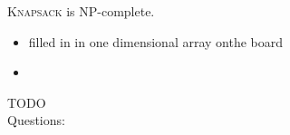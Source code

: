 \documentclass[a4]{scrartcl}
\begin{document}
\textsc{Knapsack} is NP-complete.

\begin{itemize}
\item filled in in one dimensional array onthe board
\item 
\end{itemize}













\color{red} TODO \\
\color{black}
\color{violet} Questions:
\color{black}



\newpage

\printbibliography
\end{document}
